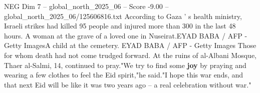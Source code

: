 \begin{textsample}{NEG Dim 7 – global\_north\_2025\_06 – Score -9.00 – global\_north\_2025\_06/125606816.txt}
According to Gaza ' s health ministry, Israeli strikes had killed 95 people and injured more than 300 in the last 48 hours.
A woman at the grave of a loved one in Nuseirat.EYAD BABA / AFP - Getty ImagesA child at the cemetery.
EYAD BABA / AFP - Getty Images Those for whom death had not come trudged forward.
At the ruins of al-Albani Mosque, Thaer al-Salmi, 14, continued to pray."We try to find some \textbf{joy} by praying and wearing a few clothes to feel the Eid spirit,"he said."I hope this war ends, and that next Eid will be like it was two years ago -- a real celebration without war."

\end{textsample}
